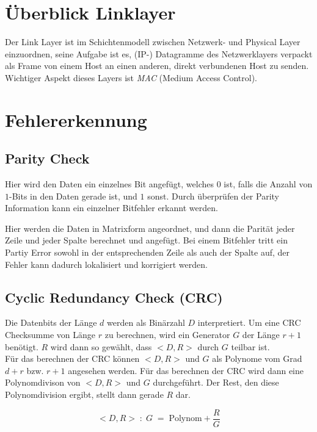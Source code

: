 \section{Überblick Linklayer}

Der Link Layer ist im Schichtenmodell zwischen Netzwerk- und Physical Layer einzuordnen, seine Aufgabe ist es, (IP-) Datagramme des Netzwerklayers verpackt als Frame von einem Host an einen anderen, direkt verbundenen Host zu senden. Wichtiger Aspekt dieses Layers ist \emph{MAC} (Medium Access Control).

\section{Fehlererkennung}
\subsection{Parity Check}
Hier wird den Daten ein einzelnes Bit angefügt, welches $0$ ist, falls die Anzahl von $1$-Bits in den Daten gerade ist, und $1$ sonst.
Durch überprüfen der Parity Information kann ein einzelner Bitfehler erkannt werden.

Hier werden die Daten in Matrixform angeordnet, und dann die Parität jeder Zeile und jeder Spalte berechnet und angefügt. Bei einem Bitfehler tritt ein Partiy Error sowohl in der entsprechenden Zeile als auch der Spalte auf, der Fehler kann dadurch lokalisiert und korrigiert werden.

\subsection{Cyclic Redundancy Check (CRC)}
Die Datenbits der Länge $d$ werden als Binärzahl $D$ interpretiert. Um eine CRC Checksumme von Länge $r$ zu berechnen, wird ein Generator $G$ der Länge $r+1$ benötigt. $R$ wird dann so gewählt, dass $<D,R>$ durch $G$ teilbar ist.\\
Für das berechnen der CRC können $<D,R>$ und $G$ als Polynome vom Grad $d+r$ bzw. $r+1$ angesehen werden. Für das berechnen der CRC wird dann eine Polynomdivison von $<D,R>$ und $G$ durchgeführt. Der Rest, den diese Polynomdivision ergibt, stellt dann gerade $R$ dar.

\begin{equation*}
    <D,R>\;:\;G\;=\;\text{Polynom}+\frac{R}{G}
\end{equation*}


